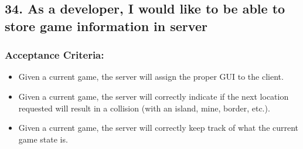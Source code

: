 \subsection*{34. As a developer, I would like to be able to store game information in server}


\subsubsection*{Acceptance Criteria:}

\begin{itemize}
\item Given a current game, the server will assign the proper GUI to the client.
\item Given a current game, the server will correctly indicate if the next location requested will result in a collision (with an island, mine, border, etc.).
\item Given a current game, the server will correctly keep track of what the current game state is.
\end{itemize}
